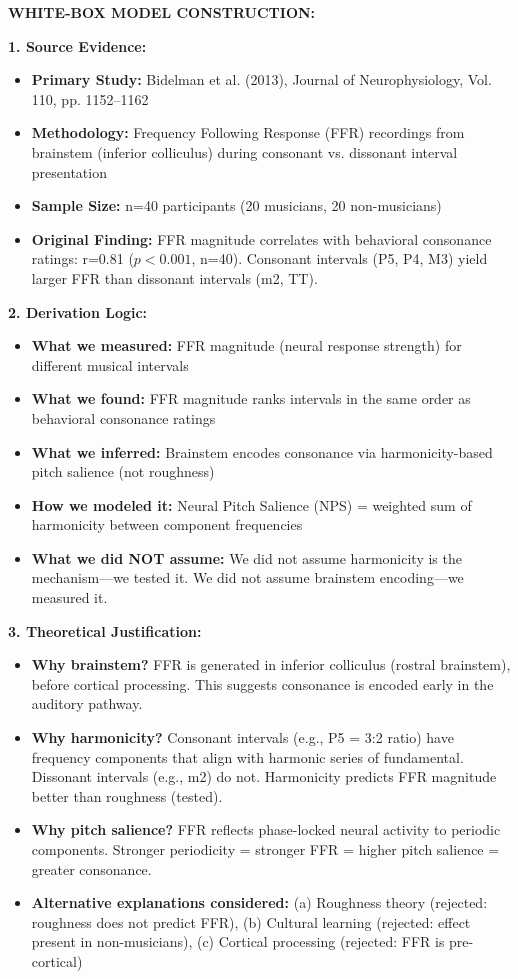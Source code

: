 \documentclass[9pt,onecolumn]{article}
\begin{document}
\textbf{WHITE-BOX MODEL CONSTRUCTION:}

\textbf{1. Source Evidence:}
\begin{itemize}[leftmargin=*, topsep=1pt, itemsep=1pt]
    \item \textbf{Primary Study:} Bidelman et al. (2013), Journal of Neurophysiology, Vol. 110, pp. 1152--1162
    \item \textbf{Methodology:} Frequency Following Response (FFR) recordings from brainstem (inferior colliculus) during consonant vs. dissonant interval presentation
    \item \textbf{Sample Size:} n=40 participants (20 musicians, 20 non-musicians)
    \item \textbf{Original Finding:} FFR magnitude correlates with behavioral consonance ratings: r=0.81 ($p<0.001$, n=40). Consonant intervals (P5, P4, M3) yield larger FFR than dissonant intervals (m2, TT).
\end{itemize}

\textbf{2. Derivation Logic:}
\begin{itemize}[leftmargin=*, topsep=1pt, itemsep=1pt]
    \item \textbf{What we measured:} FFR magnitude (neural response strength) for different musical intervals
    \item \textbf{What we found:} FFR magnitude ranks intervals in the same order as behavioral consonance ratings
    \item \textbf{What we inferred:} Brainstem encodes consonance via harmonicity-based pitch salience (not roughness)
    \item \textbf{How we modeled it:} Neural Pitch Salience (NPS) = weighted sum of harmonicity between component frequencies
    \item \textbf{What we did NOT assume:} We did not assume harmonicity is the mechanism---we tested it. We did not assume brainstem encoding---we measured it.
\end{itemize}

\textbf{3. Theoretical Justification:}
\begin{itemize}[leftmargin=*, topsep=1pt, itemsep=1pt]
    \item \textbf{Why brainstem?} FFR is generated in inferior colliculus (rostral brainstem), before cortical processing. This suggests consonance is encoded early in the auditory pathway.
    \item \textbf{Why harmonicity?} Consonant intervals (e.g., P5 = 3:2 ratio) have frequency components that align with harmonic series of fundamental. Dissonant intervals (e.g., m2) do not. Harmonicity predicts FFR magnitude better than roughness (tested).
    \item \textbf{Why pitch salience?} FFR reflects phase-locked neural activity to periodic components. Stronger periodicity = stronger FFR = higher pitch salience = greater consonance.
    \item \textbf{Alternative explanations considered:} (a) Roughness theory (rejected: roughness does not predict FFR), (b) Cultural learning (rejected: effect present in non-musicians), (c) Cortical processing (rejected: FFR is pre-cortical)
\end{itemize}
\end{document}
